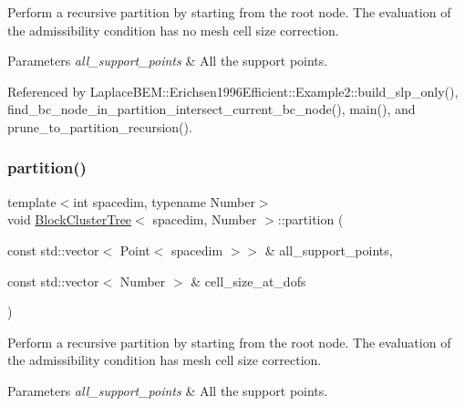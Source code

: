 Perform a recursive partition by starting from the root node. The evaluation of the admissibility condition has no mesh cell size correction.


\begin{DoxyParams}{Parameters}
{\em all\+\_\+support\+\_\+points} & All the support points. \\
\hline
\end{DoxyParams}


Referenced by Laplace\+B\+E\+M\+::\+Erichsen1996\+Efficient\+::\+Example2\+::build\+\_\+slp\+\_\+only(), find\+\_\+bc\+\_\+node\+\_\+in\+\_\+partition\+\_\+intersect\+\_\+current\+\_\+bc\+\_\+node(), main(), and prune\+\_\+to\+\_\+partition\+\_\+recursion().

\mbox{\label{classBlockClusterTree_a075983197c805c6451aa00502dc30e76}} 
\subsubsection{\texorpdfstring{partition()}{partition()}\hspace{0.1cm}{\footnotesize\ttfamily [2/2]}}
{\footnotesize\ttfamily template$<$int spacedim, typename Number$>$ \\
void \hyperlink{classBlockClusterTree}{Block\+Cluster\+Tree}$<$ spacedim, Number $>$\+::partition (\begin{DoxyParamCaption}\item[{const std\+::vector$<$ Point$<$ spacedim $>$$>$ \&}]{all\+\_\+support\+\_\+points,  }\item[{const std\+::vector$<$ Number $>$ \&}]{cell\+\_\+size\+\_\+at\+\_\+dofs }\end{DoxyParamCaption})}

Perform a recursive partition by starting from the root node. The evaluation of the admissibility condition has mesh cell size correction.


\begin{DoxyParams}{Parameters}
{\em all\+\_\+support\+\_\+points} & All the support points. \\
\hline
\end{DoxyParams}
\mbox{\label{classBlockClusterTree_a0e40b3884535eae57d00c078ec782459}} 

